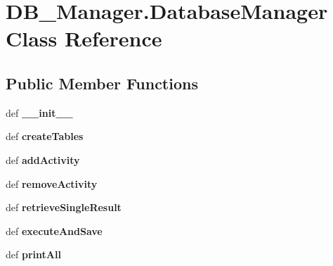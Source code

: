 \hypertarget{classDB__Manager_1_1DatabaseManager}{\section{D\-B\-\_\-\-Manager.\-Database\-Manager Class Reference}
\label{classDB__Manager_1_1DatabaseManager}
}
\subsection*{Public Member Functions}
\begin{DoxyCompactItemize}
\item 
\hypertarget{classDB__Manager_1_1DatabaseManager_a85666dbb8f3aa7925fa67d99db814cbf}{def {\bfseries \-\_\-\-\_\-init\-\_\-\-\_\-}}\label{classDB__Manager_1_1DatabaseManager_a85666dbb8f3aa7925fa67d99db814cbf}

\item 
\hypertarget{classDB__Manager_1_1DatabaseManager_ad89246a662dcb824b5f901b6153845a6}{def {\bfseries create\-Tables}}\label{classDB__Manager_1_1DatabaseManager_ad89246a662dcb824b5f901b6153845a6}

\item 
\hypertarget{classDB__Manager_1_1DatabaseManager_a326a1dba61220f889770bcd5241f430c}{def {\bfseries add\-Activity}}\label{classDB__Manager_1_1DatabaseManager_a326a1dba61220f889770bcd5241f430c}

\item 
\hypertarget{classDB__Manager_1_1DatabaseManager_a104922817cbc9420b57b9c2d68ad296a}{def {\bfseries remove\-Activity}}\label{classDB__Manager_1_1DatabaseManager_a104922817cbc9420b57b9c2d68ad296a}

\item 
\hypertarget{classDB__Manager_1_1DatabaseManager_a1df8fdb4dbd87dcedfa3382024689508}{def {\bfseries retrieve\-Single\-Result}}\label{classDB__Manager_1_1DatabaseManager_a1df8fdb4dbd87dcedfa3382024689508}

\item 
\hypertarget{classDB__Manager_1_1DatabaseManager_abc5c71e59aa2a4af2766e2054c35c511}{def {\bfseries execute\-And\-Save}}\label{classDB__Manager_1_1DatabaseManager_abc5c71e59aa2a4af2766e2054c35c511}

\item 
\hypertarget{classDB__Manager_1_1DatabaseManager_a16dd65216c89481a7e45f2d5d1b18b0c}{def {\bfseries print\-All}}\label{classDB__Manager_1_1DatabaseManager_a16dd65216c89481a7e45f2d5d1b18b0c}

\end{DoxyCompactItemize}
